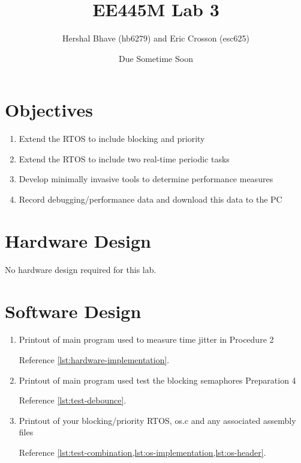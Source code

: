 \documentclass[12pt]{article}
\title{EE445M Lab 3}
\author{Hershal Bhave (hb6279) and Eric Crosson (esc625)}
\date{Due Sometime Soon}
\begin{document}
\maketitle

\section{Objectives}
\begin{enumerate}
\item Extend the RTOS to include blocking and priority
\item Extend the RTOS to include two real-time periodic tasks
\item Develop minimally invasive tools to determine performance
  measures
\item Record debugging/performance data and download this data to the
  PC
\end{enumerate}

\section{Hardware Design}
No hardware design required for this lab.

\section{Software Design}
\begin{enumerate}
\item Printout of main program used to measure time jitter in
  Procedure 2

Reference \cref{lst:hardware-implementation}.
\item Printout of main program used test the blocking semaphores Preparation 4

Reference \cref{lst:test-debounce}.
\item Printout of your blocking/priority RTOS, os.c and any associated assembly files

Reference \cref{lst:test-combination,lst:os-implementation,lst:os-header}.
\end{enumerate}
\end{document}
